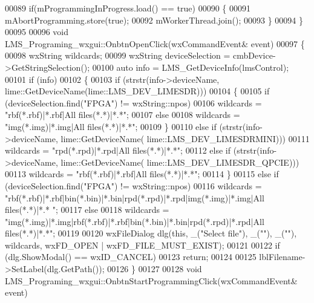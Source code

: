 \begin{DoxyCode}
00089     \textcolor{keywordflow}{if}(mProgrammingInProgress.load() == \textcolor{keyword}{true})
00090     \{
00091         mAbortProgramming.store(\textcolor{keyword}{true});
00092         mWorkerThread.join();
00093     \}
00094 \}
00095 
00096 \textcolor{keywordtype}{void} LMS_Programing_wxgui::OnbtnOpenClick(wxCommandEvent& event)
00097 \{
00098     wxString wildcards;
00099     wxString deviceSelection = cmbDevice->GetStringSelection();
00100     \textcolor{keyword}{auto} info = LMS_GetDeviceInfo(lmsControl);
00101     \textcolor{keywordflow}{if} (info)
00102     \{
00103         \textcolor{keywordflow}{if} (strstr(info->deviceName, lime::GetDeviceName(lime::LMS_DEV_LIMESDR)))
00104         \{
00105             \textcolor{keywordflow}{if} (deviceSelection.find(\textcolor{stringliteral}{"FPGA"}) != wxString::npos)
00106                 wildcards = \textcolor{stringliteral}{"rbf(*.rbf)|*.rbf|All files(*.*)|*.*"};
00107             \textcolor{keywordflow}{else}
00108                 wildcards = \textcolor{stringliteral}{"img(*.img)|*.img|All files(*.*)|*.*"};
00109         \}
00110         \textcolor{keywordflow}{else} \textcolor{keywordflow}{if} (strstr(info->deviceName, lime::GetDeviceName(
      lime::LMS_DEV_LIMESDRMINI)))
00111             wildcards = \textcolor{stringliteral}{"rpd(*.rpd)|*.rpd|All files(*.*)|*.*"};
00112         \textcolor{keywordflow}{else} \textcolor{keywordflow}{if} (strstr(info->deviceName, lime::GetDeviceName(
      lime::LMS_DEV_LIMESDR_QPCIE)))
00113             wildcards = \textcolor{stringliteral}{"rbf(*.rbf)|*.rbf|All files(*.*)|*.*"};
00114     \}
00115     \textcolor{keywordflow}{else} \textcolor{keywordflow}{if} (deviceSelection.find(\textcolor{stringliteral}{"FPGA"}) != wxString::npos)
00116         wildcards = \textcolor{stringliteral}{"rbf(*.rbf)|*.rbf|bin(*.bin)|*.bin|rpd(*.rpd)|*.rpd|img(*.img)|*.img|All files(*.*)|*.*
      "};
00117     \textcolor{keywordflow}{else}
00118          wildcards = \textcolor{stringliteral}{"img(*.img)|*.img|rbf(*.rbf)|*.rbf|bin(*.bin)|*.bin|rpd(*.rpd)|*.rpd|All
       files(*.*)|*.*"};
00119 
00120     wxFileDialog dlg(\textcolor{keyword}{this}, \_(\textcolor{stringliteral}{"Select file"}), \_(\textcolor{stringliteral}{""}), \_(\textcolor{stringliteral}{""}), wildcards, wxFD\_OPEN | wxFD\_FILE\_MUST\_EXIST);
00121 
00122     \textcolor{keywordflow}{if} (dlg.ShowModal() == wxID\_CANCEL)
00123         \textcolor{keywordflow}{return};
00124 
00125     lblFilename->SetLabel(dlg.GetPath());
00126 \}
00127 
00128 \textcolor{keywordtype}{void} LMS_Programing_wxgui::OnbtnStartProgrammingClick(wxCommandEvent& event)

\end{DoxyCode}
